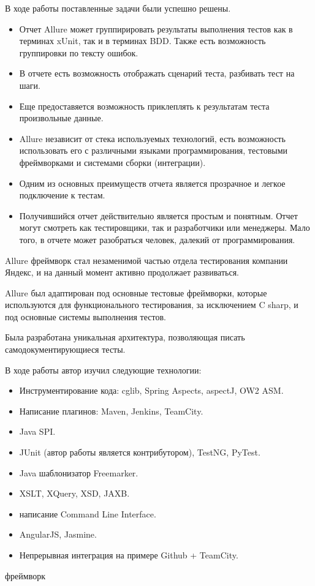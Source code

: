 \startconclusionpage

В ходе работы поставленные задачи были успешно решены.

\begin{itemize}
\item Отчет Allure может группирировать результаты выполнения тестов как в терминах xUnit, так и в терминах BDD. Также есть возможность группировки по тексту ошибок.
\item В отчете есть возможность отображать сценарий теста, разбивать тест на шаги.
\item Еще предоставяется возможность приклеплять к результатам теста произвольные данные.
\item Allure независит от стека используемых технологий, есть возможность использовать его с различными языками программирования, тестовыми фреймворками и системами сборки (интеграции). 
\item Одним из основных преимуществ отчета является прозрачное и легкое подключение к тестам.
\item Получившийся отчет действительно является простым и понятным. Отчет могут смотреть как тестировщики, так и разработчики или менеджеры. Мало того, в отчете может разобраться человек, далекий от программирования.
\end{itemize}

Allure фреймворк стал незаменимой частью отдела тестирования компании Яндекс, и на данный момент активно продолжает развиваться. 

Allure был адаптирован под основные тестовые фреймворки, которые используются для функционального тестирования, за исключением C sharp, и под основные системы выполнения тестов. 

Была разработана уникальная архитектура, позволяющая писать самодокументирующиеся тесты.

В ходе работы автор изучил следующие технологии:

\begin{itemize}
\item Инструментирование кода: cglib, Spring Aspects, aspectJ, OW2 ASM.
\item Написание плагинов: Maven, Jenkins, TeamCity.
\item Java SPI.
\item JUnit (автор работы является контрибутором), TestNG, PyTest.
\item Java шаблонизатор Freemarker.
\item XSLT, XQuery, XSD, JAXB.
\item написание Command Line Interface.
\item AngularJS, Jasmine.
\item Непрерывная интеграция на примере Github + TeamCity.
\end{itemize}

 
фреймворк